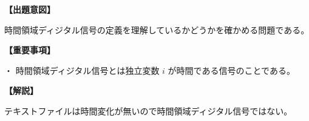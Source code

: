\noindent \textbf{【出題意図】}

\noindent 時間領域ディジタル信号の定義を理解しているかどうかを確かめる問題である。

\vspace{1em}
\noindent \textbf{【重要事項】}

\medskip
\noindent ・ 時間領域ディジタル信号とは独立変数 $i$ が時間である信号のことである。

\vspace{1em}
\noindent \textbf{【解説】}

\noindent テキストファイルは時間変化が無いので時間領域ディジタル信号ではない。

